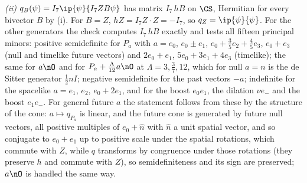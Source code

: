 \emph{(ii)} $q_{B}(\psi) = I_{7}\ip{\psi}{I_{7}ZB\psi}$ has matrix $I_{7}\,hB$ on $\CS$, Hermitian for every bivector $B$ by (i). For $B = Z$, $hZ = I_{7}Z\cdot Z = -I_{7}$, so $q_{Z} = \ip{\psi}{\psi}$. For the other generators the check computes $I_{7}\,hB$ exactly and tests all fifteen principal minors: positive semidefinite for $P_{a}$ with $a = e_{0}$, $e_{0} \pm e_{1}$, $e_{0} + \tfrac35 e_{2} + \tfrac45 e_{3}$, $e_{0} + e_{3}$ (null and timelike future vectors) and $2e_{0} + e_{1}$, $5e_{0} + 3e_{1} + 4e_{3}$ (timelike); the same for $a\nO$ and for $P_{a} + \tfrac{\Lambda}{12}a\nO$ at $\Lambda = 3, \tfrac37, 12$, which for null $a = n$ is the de Sitter generator $\tfrac12 nI$; negative semidefinite for the past vectors $-a$; indefinite for the spacelike $a = e_{1}$, $e_{2}$, $e_{0} + 2e_{1}$, and for the boost $e_{0}e_{1}$, the dilation $\nu e_{-}$ and the boost $e_{1}e_{-}$. For general future $a$ the statement follows from these by the structure of the cone: $a \mapsto q_{P_{a}}$ is linear, and the future cone is generated by future null vectors, all positive multiples of $e_{0} + \hat n$ with $\hat n$ a unit spatial vector, and so conjugate to $e_{0} + e_{1}$ up to positive scale under the spatial rotations, which commute with $Z$, while $q$ transforms by congruence under those rotations (they preserve $h$ and commute with $Z$), so semidefiniteness and its sign are preserved; $a\nO$ is handled the same way.

